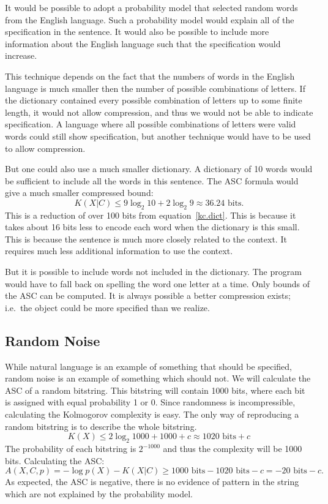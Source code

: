 It would be possible to adopt a probability model that selected random words from the English language.
Such a probability model would explain all of the specification in the sentence.
It would also be possible to include more information about the English language such that the specification would increase.

This technique depends on the fact that the numbers of words in the English language is much smaller then the number of possible combinations of letters.
If the dictionary contained every possible combination of letters up to some finite length, it would not allow compression, and thus we would not be able to indicate specification.
A language where all possible combinations of letters were valid words could still show specification, but another technique would have to be used to allow compression.

But one could also use a much smaller dictionary.
A dictionary of 10 words would be sufficient to include all the words in this sentence.
The ASC formula would give a much smaller compressed bound:
\begin{equation}
    K(X|C) \leq 9 \log_2 10 + 2 \log_2 9 \approx 36.24 \mbox{ bits.}
\end{equation}
This is a reduction of over 100 bits from equation~\ref{kc.dict}.
This is because it takes about 16 bits less to encode each word when the dictionary is this small.
This is because the sentence is much more closely related to the context.
It requires much less additional information to use the context.

But it is possible to include words not included in the dictionary.
The program would have to fall back on spelling the word one letter at a time.
Only bounds of the ASC can be computed.
It is always possible a better compression exists; i.e.\ the object could be more specified than we realize.

\subsection{Random Noise}
While natural language is an example of something that should be specified, random noise is an example of something which should not.
We will calculate the ASC of a random bitstring.
This bitstring will contain 1000 bits, where each bit is assigned with equal probability 1 or 0.
Since randomness is incompressible, calculating the Kolmogorov complexity is easy.
The only way of reproducing a random bitstring is to describe the whole bitstring.
\begin{equation}
    K(X) \leq 2 \log_2 1000 + 1000 + c \approx 1020 \mbox{ bits} + c
\end{equation}
The probability of each bitstring is $2^{-1000}$ and thus the complexity will be 1000 bits.
Calculating the ASC:
\begin{equation}
    A(X,C,p) = - \log p(X) - K(X|C) \geq 1000 \mbox{ bits} - 1020 \mbox{ bits} - c = -20 \mbox{ bits} - c \mbox{.}
\end{equation}
As expected, the ASC is negative, there is no evidence of pattern in the string which are not explained by the probability model.

